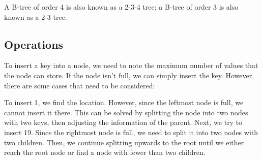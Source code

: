 A B-tree of order 4 is also known as a 2-3-4 tree; a B-tree of order 3 is also known as a 2-3 tree.

\subsection{Operations}
To insert a key into a node, we need to note the maximum number of values that the node can store. If the node isn't full, we can simply insert the key. However, there are some cases that need to be considered:

To insert 1, we find the location. However, since the leftmost node is full, we cannot insert it there. This can be solved by splitting the node into two nodes with two keys, then adjusting the information of the parent. Next, we try to insert 19. Since the rightmost node is full, we need to split it into two nodes with two children. Then, we continue splitting upwards to the root until we either reach the root node or find a node with fewer than two children.

